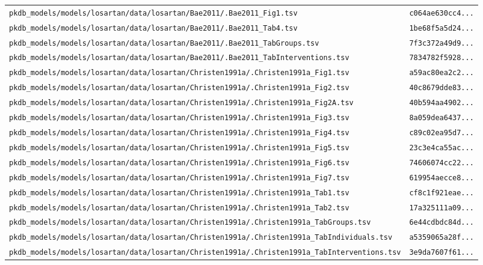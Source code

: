 \begin{longtable}{ll}
\texttt{pkdb\_models/models/losartan/data/losartan/Bae2011/.Bae2011\_Fig1.tsv} & \texttt{c064ae630cc4...} \\
\texttt{pkdb\_models/models/losartan/data/losartan/Bae2011/.Bae2011\_Tab4.tsv} & \texttt{1be68f5a5d24...} \\
\texttt{pkdb\_models/models/losartan/data/losartan/Bae2011/.Bae2011\_TabGroups.tsv} & \texttt{7f3c372a49d9...} \\
\texttt{pkdb\_models/models/losartan/data/losartan/Bae2011/.Bae2011\_TabInterventions.tsv} & \texttt{7834782f5928...} \\
\texttt{pkdb\_models/models/losartan/data/losartan/Christen1991a/.Christen1991a\_Fig1.tsv} & \texttt{a59ac80ea2c2...} \\
\texttt{pkdb\_models/models/losartan/data/losartan/Christen1991a/.Christen1991a\_Fig2.tsv} & \texttt{40c8679dde83...} \\
\texttt{pkdb\_models/models/losartan/data/losartan/Christen1991a/.Christen1991a\_Fig2A.tsv} & \texttt{40b594aa4902...} \\
\texttt{pkdb\_models/models/losartan/data/losartan/Christen1991a/.Christen1991a\_Fig3.tsv} & \texttt{8a059dea6437...} \\
\texttt{pkdb\_models/models/losartan/data/losartan/Christen1991a/.Christen1991a\_Fig4.tsv} & \texttt{c89c02ea95d7...} \\
\texttt{pkdb\_models/models/losartan/data/losartan/Christen1991a/.Christen1991a\_Fig5.tsv} & \texttt{23c3e4ca55ac...} \\
\texttt{pkdb\_models/models/losartan/data/losartan/Christen1991a/.Christen1991a\_Fig6.tsv} & \texttt{74606074cc22...} \\
\texttt{pkdb\_models/models/losartan/data/losartan/Christen1991a/.Christen1991a\_Fig7.tsv} & \texttt{619954aecce8...} \\
\texttt{pkdb\_models/models/losartan/data/losartan/Christen1991a/.Christen1991a\_Tab1.tsv} & \texttt{cf8c1f921eae...} \\
\texttt{pkdb\_models/models/losartan/data/losartan/Christen1991a/.Christen1991a\_Tab2.tsv} & \texttt{17a325111a09...} \\
\texttt{pkdb\_models/models/losartan/data/losartan/Christen1991a/.Christen1991a\_TabGroups.tsv} & \texttt{6e44cdbdc84d...} \\
\texttt{pkdb\_models/models/losartan/data/losartan/Christen1991a/.Christen1991a\_TabIndividuals.tsv} & \texttt{a5359065a28f...} \\
\texttt{pkdb\_models/models/losartan/data/losartan/Christen1991a/.Christen1991a\_TabInterventions.tsv} & \texttt{3e9da7607f61...} \\

\end{longtable}

